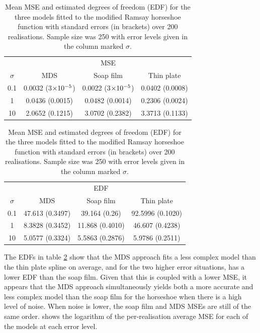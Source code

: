 \begin{table}[ht]
\centering
\begin{tabular}{c c c c}
 & & MSE & \\ 
$\sigma$ & MDS & Soap film & Thin plate\\ 
\hline
0.1  & 0.0032 (3$\times10^{-5}$) & 0.0022 (3$\times10^{-5}$) & 0.0402 (0.0008) \\ 
1  & 0.0436 (0.0015) & 0.0482 (0.0014) & 0.2306 (0.0024) \\ 
10  & 2.0652 (0.1215) & 3.0702 (0.2382) & 3.3713 (0.1133) \\ 
\end{tabular}
\begin{tabular}{c  c c c }
&  & EDF & \\ 
$\sigma$ & MDS & Soap film & Thin plate\\ 
\hline
0.1 & 47.613 (0.3497) & 39.164 (0.26) & 92.5996 (0.1020)\\ 
1  & 8.3828 (0.3452) & 11.868 (0.4010) & 46.607 (0.4238)\\ 
10 & 5.0577 (0.3324) & 5.5863 (0.2876) & 5.9786 (0.2511)\\ 
\end{tabular}
\caption{Mean MSE and estimated degrees of freedom (EDF) for the three models fitted to the modified Ramsay horseshoe function with standard errors (in brackets) over 200 realisations. Sample size was 250 with error levels given in the column marked $\sigma$.}
\label{ramsayresultstable}
\end{table}

The EDFs in table \ref{ramsayresultstable} show that the MDS approach fits a less complex model than the thin plate spline on average, and for the two higher error situations, has a lower EDF than the soap film. Given that this is coupled with a lower MSE, it appears that the MDS approach simultaneously yields both a more accurate and less complex model than the soap film for the horseshoe when there is a high level of noise. When noise is lower, the soap film and MDS MSEs are still of the same order.  shows the logarithm of the per-realisation average MSE for each of the models at each error level.


